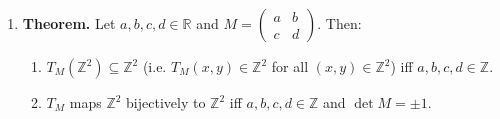 \documentclass[11pt]{article}
\theoremstyle{definition}
\theoremstyle{named}
\begin{document}
\begin{enumerate}
    \item \textbf{Theorem. } Let $a,b,c,d \in \mathbb{R}$ and $M=\begin{pmatrix}
        a & b\\
        c & d
    \end{pmatrix}$. Then: 
    \begin{enumerate}
        \item $T_M(\mathbb{Z}^2) \subseteq \mathbb{Z}^2$ (i.e. $T_M(x,y) \in \mathbb{Z}^2$ for all $(x,y) \in \mathbb{Z}^2$) iff $a,b,c,d \in \mathbb{Z}$. 
        \item $T_M$ maps $\mathbb{Z}^2$ bijectively to $\mathbb{Z}^2$ iff $a,b,c,d \in \mathbb{Z}$ and $\det M = \pm 1$. 
    \end{enumerate}
\end{enumerate}
\end{document}
